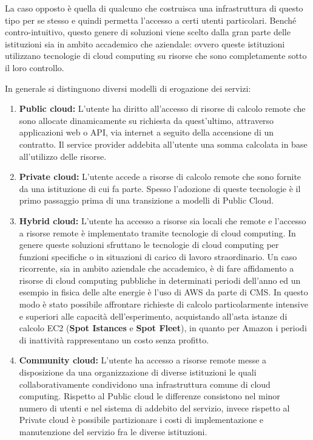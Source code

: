 \documentclass[italian,]{article}
\providecommand{\tightlist}{%
  \setlength{\itemsep}{0pt}\setlength{\parskip}{0pt}}
\begin{document}
La caso opposto è quella di qualcuno che costruisca una infrastruttura
di questo tipo per se stesso e quindi permetta l'accesso a certi utenti
particolari. Benché contro-intuitivo, questo genere di soluzioni viene
scelto dalla gran parte delle istituzioni sia in ambito accademico che
aziendale: ovvero queste istituzioni utilizzano tecnologie di cloud
computing su risorse che sono completamente sotto il loro controllo.

In generale si distinguono diversi modelli di erogazione dei servizi:

\begin{enumerate}
\def\labelenumi{\arabic{enumi}.}
\tightlist
\item
  \textbf{Public cloud:} L'utente ha diritto all'accesso di risorse di
  calcolo remote che sono allocate dinamicamente su richiesta da
  quest'ultimo, attraverso applicazioni web o API, via internet a
  seguito della accensione di un contratto. Il service provider addebita
  all'utente una somma calcolata in base all'utilizzo delle risorse.
\item
  \textbf{Private cloud:} L'utente accede a risorse di calcolo remote
  che sono fornite da una istituzione di cui fa parte. Spesso l'adozione
  di queste tecnologie è il primo passaggio prima di una transizione a
  modelli di Public Cloud. 
\item
  \textbf{Hybrid cloud:} L'utente ha accesso a risorse sia locali che
  remote e l'accesso a risorse remote è implementato tramite tecnologie
  di cloud computing. In genere queste soluzioni sfruttano le tecnologie
  di cloud computing per funzioni specifiche o in situazioni di carico
  di lavoro straordinario. Un caso ricorrente, sia in ambito aziendale
  che accademico, è di fare affidamento a risorse di cloud computing
  pubbliche in determinati periodi dell'anno ed un esempio in fisica
  delle alte energie è l'uso di AWS da parte di CMS. In questo modo è
  stato possibile affrontare richieste di calcolo particolarmente
  intensive e superiori alle capacità dell'esperimento, acquistando
  all'asta istanze di calcolo EC2 (\textbf{Spot Istances} e \textbf{Spot
  Fleet}), in quanto per Amazon i periodi di inattività rappresentano un
  costo senza profitto.
\item
  \textbf{Community cloud:} L'utente ha accesso a risorse remote messe a
  disposizione da una organizzazione di diverse istituzioni le quali
  collaborativamente condividono una infrastruttura comune di cloud
  computing. Rispetto al Public cloud le differenze consistono nel minor
  numero di utenti e nel sistema di addebito del servizio, invece
  rispetto al Private cloud è possibile partizionare i costi di
  implementazione e manutenzione del servizio fra le diverse
  istituzioni.
\end{enumerate}
\end{document}
